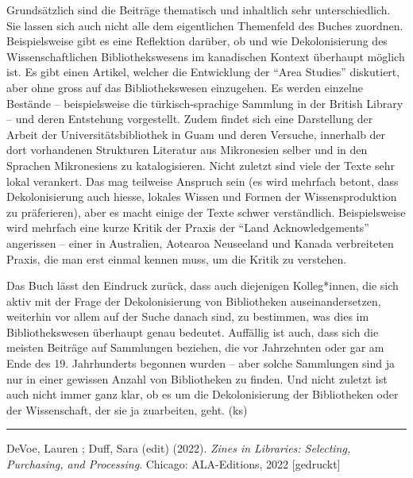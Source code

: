 \documentclass[a4paper,
fontsize=11pt,
oneside,
numbers=noperiodatend,
parskip=half-,
bibliography=totoc,
final
]{scrartcl}
\begin{document}
Grundsätzlich sind die Beiträge thematisch und inhaltlich sehr
unterschiedlich. Sie lassen sich auch nicht alle dem eigentlichen
Themenfeld des Buches zuordnen. Beispielsweise gibt es eine Reflektion
darüber, ob und wie Dekolonisierung des Wissenschaftlichen
Bibliothekswesens im kanadischen Kontext überhaupt möglich ist. Es gibt
einen Artikel, welcher die Entwicklung der \enquote{Area Studies}
diskutiert, aber ohne gross auf das Bibliothekswesen einzugehen. Es
werden einzelne Bestände -- beispielsweise die türkisch-sprachige
Sammlung in der British Library -- und deren Entstehung vorgestellt.
Zudem findet sich eine Darstellung der Arbeit der Universitätsbibliothek
in Guam und deren Versuche, innerhalb der dort vorhandenen Strukturen
Literatur aus Mikronesien selber und in den Sprachen Mikronesiens zu
katalogisieren. Nicht zuletzt sind viele der Texte sehr lokal verankert.
Das mag teilweise Anspruch sein (es wird mehrfach betont, dass
Dekolonisierung auch hiesse, lokales Wissen und Formen der
Wissensproduktion zu präferieren), aber es macht einige der Texte schwer
verständlich. Beispielsweise wird mehrfach eine kurze Kritik der Praxis
der \enquote{Land Acknowledgements} angerissen -- einer in Australien,
Aotearoa Neuseeland und Kanada verbreiteten Praxis, die man erst einmal
kennen muss, um die Kritik zu verstehen.

Das Buch lässt den Eindruck zurück, dass auch diejenigen Kolleg*innen,
die sich aktiv mit der Frage der Dekolonisierung von Bibliotheken
auseinandersetzen, weiterhin vor allem auf der Suche danach sind, zu
bestimmen, was dies im Bibliothekswesen überhaupt genau bedeutet.
Auffällig ist auch, dass sich die meisten Beiträge auf Sammlungen
beziehen, die vor Jahrzehnten oder gar am Ende des 19. Jahrhunderts
begonnen wurden -- aber solche Sammlungen sind ja nur in einer gewissen
Anzahl von Bibliotheken zu finden. Und nicht zuletzt ist auch nicht
immer ganz klar, ob es um die Dekolonisierung der Bibliotheken oder der
Wissenschaft, der sie ja zuarbeiten, geht. (ks)

\begin{center}\rule{0.5\linewidth}{0.5pt}\end{center}

DeVoe, Lauren ; Duff, Sara (edit) (2022). \emph{Zines in Libraries:
Selecting, Purchasing, and Processing}. Chicago: ALA-Editions, 2022
{[}gedruckt{]}
\end{document}
